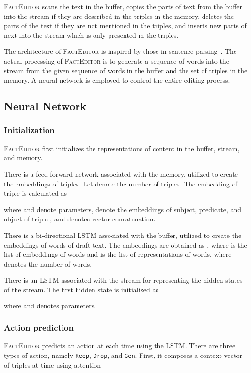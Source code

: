 \documentclass[11pt,a4paper]{article}
\begin{document}
\textsc{FactEditor} scans the text in the buffer, copies the parts of text from the buffer into the stream if they are described in the triples in the memory, deletes the parts of the text if they are not mentioned in the triples, and inserts new parts of next into the stream which is only presented in the triples.

The architecture of \textsc{FactEditor} is inspired by those in sentence parsing~\citet{dyer2015transition,watanabe-sumita-2015-transition}. The actual processing of \textsc{FactEditor} is to generate a sequence of words into the stream from the given sequence of words in the buffer and the set of triples in the memory.  A neural network is employed to control the entire editing process.

\subsection{Neural Network}
\label{sec:components}
\subsubsection*{Initialization}

\textsc{FactEditor} first initializes the representations of content in the buffer, stream, and memory.

There is a feed-forward network associated with the memory, utilized to create the embeddings of triples. Let  denote the number of triples. The embedding of triple  is calculated as 

where  and  denote parameters,  denote the embeddings of subject, predicate, and object of triple , and  denotes vector concatenation.

There is a bi-directional \textsc{LSTM} associated with the buffer, utilized to create the embeddings of words of draft text. The embeddings are obtained as ,
where  is the list of embeddings of words and  is the list of representations of words, where  denotes the number of words.

There is an LSTM associated with the stream for representing the hidden states of the stream. The first 
hidden state is initialized as

where  and  denotes parameters.

\subsubsection*{Action prediction}

\textsc{FactEditor} predicts an action at each time  using the LSTM. There are three types of action, namely \texttt{Keep}, \texttt{Drop}, and \texttt{Gen}. First, it composes a context vector  of triples at time  using attention
\end{document}
